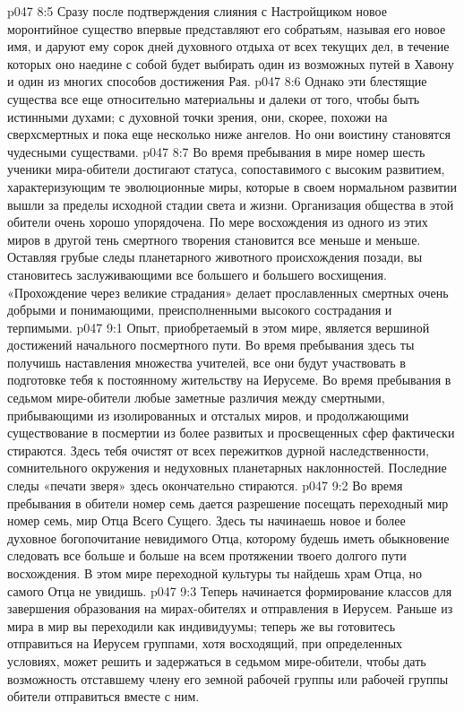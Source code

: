 \vs p047 8:5 Сразу после подтверждения слияния с Настройщиком новое моронтийное существо впервые представляют его собратьям, называя его новое имя, и даруют ему сорок дней духовного отдыха от всех текущих дел, в течение которых оно наедине с собой будет выбирать один из возможных путей в Хавону и один из многих способов достижения Рая.
\vs p047 8:6 \pc Однако эти блестящие существа все еще относительно материальны и далеки от того, чтобы быть истинными духами; с духовной точки зрения, они, скорее, похожи на сверхсмертных и пока еще несколько ниже ангелов. Но они воистину становятся чудесными существами.
\vs p047 8:7 Во время пребывания в мире номер шесть ученики мира\hyp{}обители достигают статуса, сопоставимого с высоким развитием, характеризующим те эволюционные миры, которые в своем нормальном развитии вышли за пределы исходной стадии света и жизни. Организация общества в этой обители очень хорошо упорядочена. По мере восхождения из одного из этих миров в другой тень смертного творения становится все меньше и меньше. Оставляя грубые следы планетарного животного происхождения позади, вы становитесь заслуживающими все большего и большего восхищения. «Прохождение через великие страдания» делает прославленных смертных очень добрыми и понимающими, преисполненными высокого сострадания и терпимыми.
\vs p047 9:1 Опыт, приобретаемый в этом мире, является вершиной достижений начального посмертного пути. Во время пребывания здесь ты получишь наставления множества учителей, все они будут участвовать в подготовке тебя к постоянному жительству на Иерусеме. Во время пребывания в седьмом мире\hyp{}обители любые заметные различия между смертными, прибывающими из изолированных и отсталых миров, и продолжающими существование в посмертии из более развитых и просвещенных сфер фактически стираются. Здесь тебя очистят от всех пережитков дурной наследственности, сомнительного окружения и недуховных планетарных наклонностей. Последние следы «печати зверя» здесь окончательно стираются.
\vs p047 9:2 Во время пребывания в обители номер семь дается разрешение посещать переходный мир номер семь, мир Отца Всего Сущего. Здесь ты начинаешь новое и более духовное богопочитание невидимого Отца, которому будешь иметь обыкновение следовать все больше и больше на всем протяжении твоего долгого пути восхождения. В этом мире переходной культуры ты найдешь храм Отца, но самого Отца не увидишь.
\vs p047 9:3 \pc Теперь начинается формирование классов для завершения образования на мирах\hyp{}обителях и отправления в Иерусем. Раньше из мира в мир вы переходили как индивидуумы; теперь же вы готовитесь отправиться на Иерусем группами, хотя восходящий, при определенных условиях, может решить и задержаться в седьмом мире\hyp{}обители, чтобы дать возможность отставшему члену его земной рабочей группы или рабочей группы обители отправиться вместе с ним.
